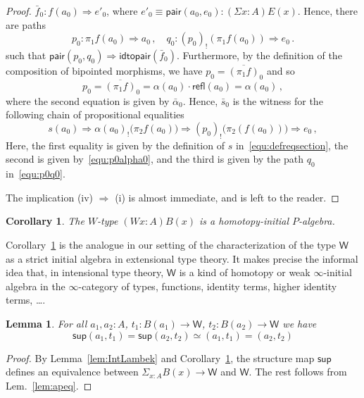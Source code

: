 \documentclass[10pt,a4paper,oneside,reqno]{amsart}
\numberwithin{equation}{section}
\theoremstyle{mythm}
\newtheorem{lemma}[theorem]{Lemma}
\newtheorem{corollary}[theorem]{Corollary}
\theoremstyle{mydef}
\theoremstyle{myrmk}
\newcommand{\peq}{\Rightarrow}
\newcommand{\co}{\colon}
\newcommand{\ct}{\cdot}
\newcommand{\idtopair}{\mathsf{idtopair}}
\newcommand{\sm}[1]{\Sigma_{#1}}
\newcommand{\pair}{\mathsf{pair}}
\newcommand{\refl}{\mathsf{refl}}
\newcommand{\W}{\mathsf{W}}
\newcommand{\wsup}{\mathsf{sup}}
\begin{document}
\begin{proof}
$\bar{f}_0 \co f(a_0) \peq e'_0$, where $e'_0 \equiv \pair(a_0, e_0) \co (\Sigma x :A ) E(x)$. Hence, there are paths 
\begin{equation}
\label{equ:p0q0}
p_0 \co \pi_1 f (a_0) \peq a_0 \, , \quad q_0 \co (p_0)_{!}( \pi_1 f (a_0)) \peq e_0 \, . 
\end{equation}
such that $\pair(p_0, q_0) \peq \idtopair(\bar{f}_0)$. Furthermore, by the definition of the composition of bipointed morphisms, we have
$p_0 =  \overline{(\pi_1 f)}_0$ and so
\begin{equation}
\label{equ:p0alpha0}
p_0 = \overline{(\pi_1 f)}_0 =  \alpha(a_0) \ct \refl(a_0)  = \alpha(a_0) \, ,
\end{equation}
where the second equation is given by $\bar{\alpha}_0$. Hence, $\bar{s}_0$ is the witness for the following chain of propositional equalities
\[
s(a_0) \peq \alpha(a_0)_{!} \big( \pi_2 f(a_0)  \big)  
              \peq  (  p_0   )_{!} \big( \pi_2(f(a_0) ) \big) 
               \peq  e_0 \, ,
\]
Here, the first equality is given by the definition of $s$ in~\eqref{equ:defreqsection}, the second is given by~\eqref{equ:p0alpha0}, and the third is given by the path $q_0$ in~\eqref{equ:p0q0}.

The implication (iv) $\Rightarrow$ (i) is almost immediate, and is left to the reader.
\end{proof}


\begin{corollary}\label{lem:WInitInt}
The $W$-type $(W x : A) B(x)$ is a homotopy-initial $P$-algebra.
\end{corollary}


Corollary~\ref{lem:WInitInt} is the analogue in our setting of the characterization of 
the type $\W$ as a strict initial algebra in extensional type theory. It makes precise the informal idea that, in intensional type theory, $\W$ is a kind of homotopy or weak $\infty$-initial
algebra in the $\infty$-category of types, functions, identity terms, higher identity terms, \ldots.  

\begin{lemma}\label{lem:suppath}
For all $a_1,a_2:A$, $t_1 : B(a_1) \to \W$, $t_2 : B(a_2) \to \W$ we have
\[ 
\wsup(a_1,t_1) = \wsup(a_2,t_2)  \simeq  (a_1,t_1) = (a_2,t_2)
\]
\end{lemma}

\begin{proof}
By Lemma~\ref{lem:IntLambek} and Corollary~\ref{lem:WInitInt}, the structure map $\wsup$ defines an equivalence between $\sm{x:A} B(x) \to \W$ and $\W$. The rest follows from Lem.~\ref{lem:apeq}.
\end{proof}
\end{document}
